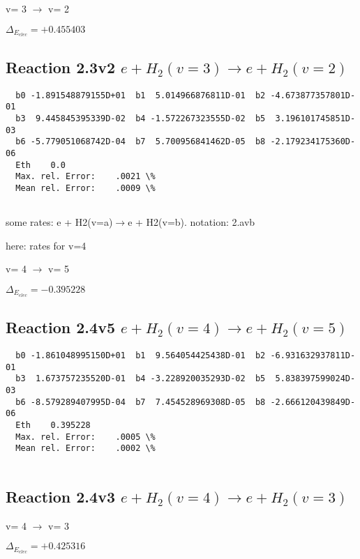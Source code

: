 \documentclass[12pt,dvipdfmx]{article}
\begin{document}
  v=  3 $\rightarrow$ v= 2

$\Delta_{E_{elec}}=+0.455403$

\subsection{
Reaction 2.3v2
$ e + H_2(v=3) \rightarrow e + H_2(v=2) $
}


\begin{small}\begin{verbatim}
  b0 -1.891548879155D+01  b1  5.014966876811D-01  b2 -4.673877357801D-01
  b3  9.445845395339D-02  b4 -1.572267323555D-02  b5  3.196101745851D-03
  b6 -5.779051068742D-04  b7  5.700956841462D-05  b8 -2.179234175360D-06
  Eth    0.0
  Max. rel. Error:    .0021 \%
  Mean rel. Error:    .0009 \%


\end{verbatim}\end{small}

\newpage
some rates: e + H2(v=a)$\rightarrow$e + H2(v=b). notation: 2.avb

here: rates for v=4

  v=  4 $\rightarrow$ v= 5

$\Delta_{E_{elec}}=-0.395228$

\subsection{
Reaction 2.4v5
$ e + H_2(v=4) \rightarrow e + H_2(v=5) $
}

\begin{small}\begin{verbatim}
  b0 -1.861048995150D+01  b1  9.564054425438D-01  b2 -6.931632937811D-01
  b3  1.673757235520D-01  b4 -3.228920035293D-02  b5  5.838397599024D-03
  b6 -8.579289407995D-04  b7  7.454528969308D-05  b8 -2.666120439849D-06
  Eth    0.395228
  Max. rel. Error:    .0005 \%
  Mean rel. Error:    .0002 \%


\end{verbatim}\end{small}

\subsection{
Reaction 2.4v3
$ e + H_2(v=4) \rightarrow e + H_2(v=3) $
}

  v=  4 $\rightarrow$ v= 3

$\Delta_{E_{elec}}=+0.425316$
\end{document}
